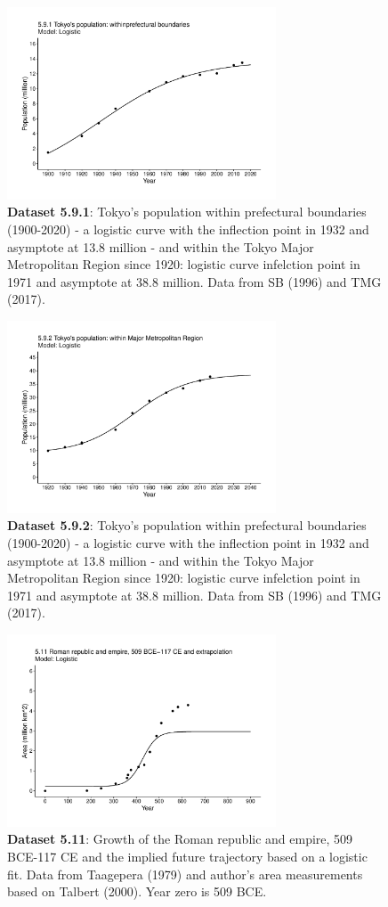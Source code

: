 \documentclass[aps,rmp,preprint,superscriptaddress,10pt,onecolumn]{article}
\begin{document}
\begin{figure}[h]
\includegraphics[width=8cm]{output/figs-ggplot/5.9.1.pdf}
\caption{\textbf{Dataset 5.9.1}: Tokyo's population within prefectural boundaries (1900-2020) - a logistic curve with the inflection point in 1932 and asymptote at 13.8 million - and within the Tokyo Major Metropolitan Region since 1920: logistic curve infelction point in 1971 and asymptote at 38.8 million. Data from SB (1996) and TMG (2017). }
\end{figure}
	
\begin{figure}[h]
\includegraphics[width=8cm]{output/figs-ggplot/5.9.2.pdf}
\caption{\textbf{Dataset 5.9.2}: Tokyo's population within prefectural boundaries (1900-2020) - a logistic curve with the inflection point in 1932 and asymptote at 13.8 million - and within the Tokyo Major Metropolitan Region since 1920: logistic curve infelction point in 1971 and asymptote at 38.8 million. Data from SB (1996) and TMG (2017). }
\end{figure}
	
\begin{figure}[h]
\includegraphics[width=8cm]{output/figs-ggplot/5.11.pdf}
\caption{\textbf{Dataset 5.11}: Growth of the Roman republic and empire, 509 BCE-117 CE and the implied future trajectory based on a logistic fit. Data from Taagepera (1979) and author's area measurements based on Talbert (2000). Year zero is 509 BCE. }
\end{figure}
	
\end{document}
